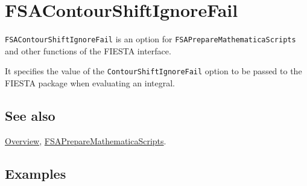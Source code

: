 \documentclass[../FeynHelpersManual.tex]{subfiles}
\begin{document}
\begin{Shaded}
\begin{Highlighting}[]
 
\end{Highlighting}
\end{Shaded}

\hypertarget{fsacontourshiftignorefail}{
\section{FSAContourShiftIgnoreFail}\label{fsacontourshiftignorefail}}

\texttt{FSAContourShiftIgnoreFail} is an option for
\texttt{FSAPrepareMathematicaScripts} and other functions of the FIESTA
interface.

It specifies the value of the \texttt{ContourShiftIgnoreFail} option to
be passed to the FIESTA package when evaluating an integral.

\subsection{See also}

\hyperlink{toc}{Overview},
\hyperlink{fsapreparemathematicascripts}{FSAPrepareMathematicaScripts}.

\subsection{Examples}
\end{document}
